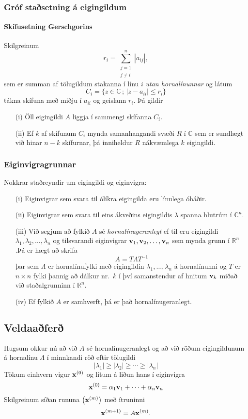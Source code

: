 \documentclass[icelandic,a4paper,12pt]{article}
\newcommand{\C}{{\mathbb  C}}
\newcommand{\R}{{\mathbb  R}}
\begin{document}
\subsubsection{Gróf staðsetning á eigingildum} 
\paragraph{Skífusetning Gerschgorins}  
Skilgreinum
$$
r_i=\sum\limits_{{\substack{j=1 \\ j\neq i}}}^n|a_{ij}|,
$$
sem er summan af tölugildum stakanna í línu $i$ {\it utan  hornalínunnar} \pause
og látum
$$
C_i=\{z\in \C\,;\, |z-a_{ii}|\leq r_i\}
$$ 
tákna skífuna með miðju í $a_{ii}$ og geislann $r_i$. \pause 
Þá gildir
\begin{enumerate}
\item[(i)] Öll eigingildi $A$ liggja í sammengi skífanna $C_i$.
\pause
\item[(ii)] Ef $k$ af skífunum $C_i$ mynda samanhangandi svæði $R$ 
í $\C$ sem er sundlægt við hinar $n-k$ skífurnar, þá inniheldur $R$ 
nákvæmlega $k$ eigingildi.
\end{enumerate}



\subsubsection{Eiginvigragrunnar} 
Nokkrar staðreyndir um eigingildi og eiginvigra:\pause
\begin{enumerate}
\item[(i)]  Eiginvigrar sem svara til ólíkra eigingilda eru línulega
  óháðir. 
\pause
\item[(ii)] Eiginvigrar sem svara til eins ákveðins eigingildis 
$\lambda$ spanna hlutrúm í $\C^n$.
\pause
\item[(iii)] Við segjum að fylkið $A$ sé \emph{hornalínugeranlegt} ef
  til eru eigingildi $\lambda_1,\lambda_2,\dots,\lambda_n$ og
  tilsvarandi eiginvigrar $\mbox{${\bf v}$}_1,\mbox{${\bf v}$}_2,\dots,\mbox{${\bf v}$}_n$ sem mynda grunn í
  $\R^n$.\pause Þá er hægt að skrifa 
$$
A=T\Lambda T^{-1}
$$
þar sem $\Lambda$ er hornalínufylki með eigingildin
$\lambda_1,\dots,\lambda_n$ á hornalínunni og $T$ er $n\times n$ fylki
þannig að dálkur nr.~$k$ í því samanstendur af hnitum $\mbox{${\bf v}$}_k$ miðað
við staðalgrunninn í $\R^n$.
\pause
\item[(iv)] Ef fylkið $A$ er samhverft, þá er það hornalínugeranlegt.
\end{enumerate}


\subsection{Veldaaðferð} 
Hugsum okkur nú að við $A$ sé hornalínugeranlegt og að við röðum 
eigingildunum á hornalínu $\Lambda$ í minnkandi röð eftir tölugildi
$$
|\lambda_1|\geq |\lambda_2|\geq \cdots\geq |\lambda_n|
$$
\pause
Tökum einhvern vigur $\mbox{${\bf x}$}^{(0)}$ og lítum á liðun hans í eiginvigra
$$
\mbox{${\bf x}$}^{(0)}=\alpha_1\mbox{${\bf v}$}_1+\cdots+\alpha_n\mbox{${\bf v}$}_n
$$
\pause
Skilgreinum síðan rununa $\big(\mbox{${\bf x}$}^{(m)}\big)$ með ítruninni
$$
\mbox{${\bf x}$}^{(m+1)}=A\mbox{${\bf x}$}^{(m)}.
$$
\end{document}
